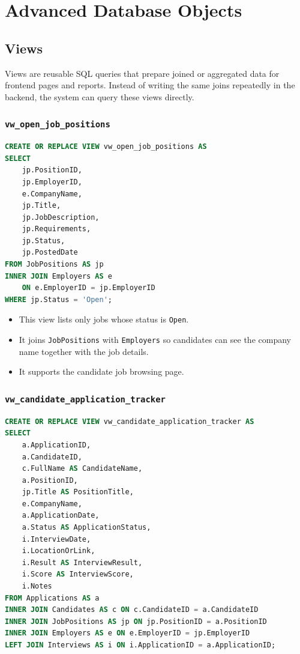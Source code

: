 \documentclass[11pt,a4paper]{report}
\begin{document}
\chapter{Advanced Database Objects}

\section{Views}

Views are reusable SQL queries that prepare joined or aggregated data for frontend pages and reports. Instead of writing the same joins repeatedly in the backend, the system can query these views directly.

\subsection*{\texttt{vw\_open\_job\_positions}}

\begin{lstlisting}[language=SQL,caption={View for open job positions}]
CREATE OR REPLACE VIEW vw_open_job_positions AS
SELECT
    jp.PositionID,
    jp.EmployerID,
    e.CompanyName,
    jp.Title,
    jp.JobDescription,
    jp.Requirements,
    jp.Status,
    jp.PostedDate
FROM JobPositions AS jp
INNER JOIN Employers AS e
    ON e.EmployerID = jp.EmployerID
WHERE jp.Status = 'Open';
\end{lstlisting}

\begin{itemize}[leftmargin=1.2cm,itemsep=0.1em]
  \item This view lists only jobs whose status is \texttt{Open}.
  \item It joins \texttt{JobPositions} with \texttt{Employers} so candidates can see the company name together with the job details.
  \item It supports the candidate job browsing page.
\end{itemize}

\subsection*{\texttt{vw\_candidate\_application\_tracker}}

\begin{lstlisting}[language=SQL,caption={View for candidate application tracking}]
CREATE OR REPLACE VIEW vw_candidate_application_tracker AS
SELECT
    a.ApplicationID,
    a.CandidateID,
    c.FullName AS CandidateName,
    a.PositionID,
    jp.Title AS PositionTitle,
    e.CompanyName,
    a.ApplicationDate,
    a.Status AS ApplicationStatus,
    i.InterviewDate,
    i.LocationOrLink,
    i.Result AS InterviewResult,
    i.Score AS InterviewScore,
    i.Notes
FROM Applications AS a
INNER JOIN Candidates AS c ON c.CandidateID = a.CandidateID
INNER JOIN JobPositions AS jp ON jp.PositionID = a.PositionID
INNER JOIN Employers AS e ON e.EmployerID = jp.EmployerID
LEFT JOIN Interviews AS i ON i.ApplicationID = a.ApplicationID;
\end{lstlisting}
\end{document}
